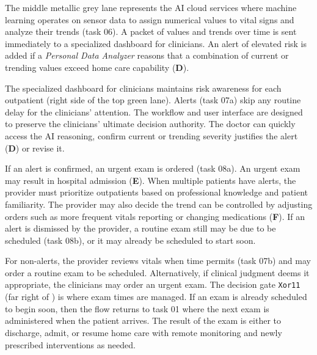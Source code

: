 The middle metallic grey lane represents the AI cloud services where machine learning operates on sensor data to assign numerical values to vital signs and analyze their trends (task 06).
A packet of values and trends over time is sent immediately to a specialized dashboard for clinicians.
An alert of elevated risk is added if a \emph{Personal Data Analyzer} reasons that a combination of current or trending values exceed home care capability (\textbf{D}).

The specialized dashboard for clinicians maintains risk awareness for each outpatient (right side of the top green lane).
Alerts (task 07a) skip any routine delay for the clinicians' attention.
The workflow and user interface are designed to preserve the clinicians' ultimate decision authority.
The doctor can quickly access the AI reasoning, confirm current or trending severity justifies the alert (\textbf{D}) or revise it.

If an alert is confirmed, an urgent exam is ordered (task 08a).
An urgent exam may result in hospital admission (\textbf{E}).
When multiple patients have alerts, the provider must prioritize outpatients based on professional knowledge and patient familiarity.
The provider may also decide the trend can be controlled by adjusting orders such as more frequent vitals reporting or changing medications (\textbf{F}).
If an alert is dismissed by the provider, a routine exam still may be due to be scheduled (task 08b), or it may already be scheduled to start soon.

For non-alerts, the provider reviews vitals when time permits (task 07b) and may order a routine exam to be scheduled.
Alternatively, if clinical judgment deems it appropriate, the clinicians may order an urgent exam.
The decision gate \texttt{Xor11} (far right of ) is where exam times are managed.
If an exam is already scheduled to begin soon, then the flow returns to task 01 where the next exam is administered when the patient arrives.
The result of the exam is either to discharge, admit, or resume home care with remote monitoring and newly prescribed interventions as needed.
